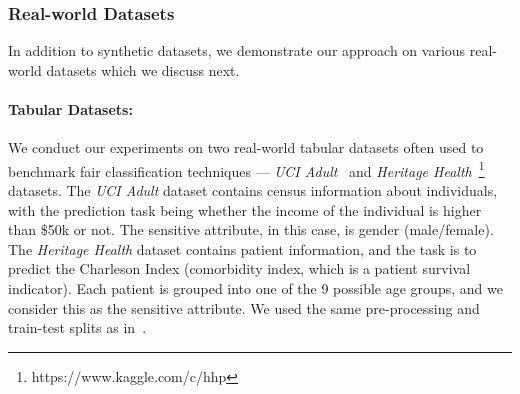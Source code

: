 
\subsubsection{Real-world Datasets}
In addition to synthetic datasets, we demonstrate our approach on various real-world datasets which we discuss next.

\paragraph{Tabular Datasets:}
We conduct our experiments on two real-world tabular datasets often used to benchmark fair classification techniques --- \textit{UCI Adult}~\cite{Dua:2019} and \textit{Heritage Health}~\footnote{https://www.kaggle.com/c/hhp} datasets. The \textit{UCI Adult} dataset contains census information about individuals, with the prediction task being whether the income of the individual is higher than \$50k or not. The sensitive attribute, in this case, is gender (male/female).  The \textit{Heritage Health} dataset contains patient information, and the task is to predict the Charleson Index (comorbidity index, which is a patient survival indicator). Each patient is grouped into one of the 9 possible age groups, and we consider this as the sensitive attribute.  We used the same pre-processing and train-test splits as in~\cite{gupta2021controllable}.

